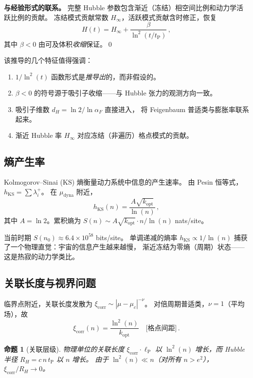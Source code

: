 \documentclass[a4paper,11pt]{article}
\theoremstyle{plain}
\newtheorem{proposition}{命题}
\newcommand{\lnq}{\ln^2}
\newcommand{\tP}{t_{\mathrm{P}}}
\newcommand{\lP}{\ell_{\mathrm{P}}}
\newcommand{\Hinf}{H_{\infty}}
\begin{document}
\textbf{与经验形式的联系。}
完整 Hubble 参数包含渐近（冻结）相空间比例和动力学活跃比例的贡献。
冻结模式贡献常数 $\Hinf$，活跃模式贡献含时修正，恢复
\begin{equation}
  \boxed{H(t) = \Hinf + \frac{\beta}{\lnq(t/\tP)}\,,}
\end{equation}
其中 $\beta < 0$ 由可及体积\emph{收缩}保证。\qed

该推导的几个特征值得强调：
\begin{enumerate}
  \item $1/\lnq(t)$ 函数形式是\emph{推导出}的，而非假设的。
  \item $\beta < 0$ 的符号源于吸引子收缩——与 Hubble 张力的观测方向一致。
  \item 吸引子维数 $d_H = \ln 2/\ln\alpha_F$ 直接进入，
    将 Feigenbaum 普适类与膨胀率联系起来。
  \item 渐近 Hubble 率 $\Hinf$ 对应冻结（非遍历）格点模式的贡献。
\end{enumerate}

\subsection{熵产生率}

Kolmogorov--Sinai (KS) 熵衡量动力系统中信息的产生速率。
由 Pesin 恒等式，$h_{\mathrm{KS}} = \sum \lambda_i^+$。
在 $\mu_{\mathrm{dyna}}$ 附近，
\begin{equation}
  h_{\mathrm{KS}}(n) = \frac{A\sqrt{k_{\mathrm{opt}}}}{\ln(n)}\,,
\end{equation}
其中 $A = \ln 2$。累积熵为
$S(n) \sim A\sqrt{k_{\mathrm{opt}}} \cdot n/\ln(n)$ nats/site。

当前时期 $S(n_0) \approx 6.4 \times 10^{58}$ bits/site。
单调递减的熵率 $h_{\mathrm{KS}} \propto 1/\ln(n)$
捕获了一个物理直觉：宇宙的信息产生越来越慢，
渐近冻结为零熵（周期）状态——这是热寂的动力学类比。

\subsection{关联长度与视界问题}

临界点附近，关联长度发散为 $\xi_{\mathrm{corr}} \sim |\mu - \mu_c|^{-\nu}$。
对倍周期普适类，$\nu = 1$（平均场），故
\begin{equation}
  \xi_{\mathrm{corr}}(n) = \frac{\lnq(n)}{k_{\mathrm{opt}}}
  \quad\text{[格点间距]}\,.
\end{equation}

\begin{proposition}[关联层级]
物理单位的关联长度 $\xi_{\mathrm{corr}} \cdot \lP$
以 $\lnq(n)$ 增长，而 Hubble 半径 $R_H = c\,n\,\tP$ 以 $n$ 增长。
由于 $\lnq(n) \ll n$（对所有 $n > e^2$），
$\xi_{\mathrm{corr}}/R_H \to 0$。
\end{proposition}
\end{document}
